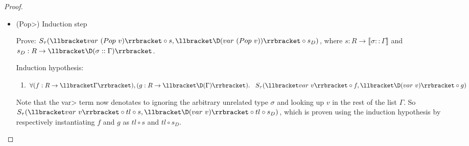 \begin{proof}
\begin{enumerate}
\begin{itemize}
          \item(\<Pop>) Induction step

          Prove: $S_\tau(\llbracket var\ (Pop\ v) \rrbracket \circ s, \llbracket \D(var\ (Pop\ v)) \rrbracket \circ s_D)$, where $s : R \rightarrow \llbracket \sigma :: \Gamma \rrbracket$ and $s_D : R \rightarrow \llbracket \D(\sigma :: \Gamma) \rrbracket$.

          Induction hypothesis:
          \begin{enumerate}\label{eqn:subst_ih_var_Pop}
            \item $\forall (f : R \rightarrow \llbracket \Gamma \rrbracket), (g : R \rightarrow \llbracket \D(\Gamma) \rrbracket). \\
            \;\;\;S_\tau(\llbracket var\ v \rrbracket \circ f, \llbracket \D(var\ v) \rrbracket \circ g)$
          \end{enumerate}

          Note that the \<var> term now denotates to ignoring the arbitrary unrelated type $\sigma$ and looking up $v$ in the rest of the list $\Gamma$.
          So $S_\tau(\llbracket var\ v \rrbracket \circ tl \circ s, \llbracket \D(var\ v) \rrbracket \circ tl \circ s_D)$, which is proven using the induction hypothesis by respectively instantiating $f$ and $g$ as $tl \circ s$ and $tl \circ s_D$.


\end{itemize}
\end{enumerate}
\end{proof}
